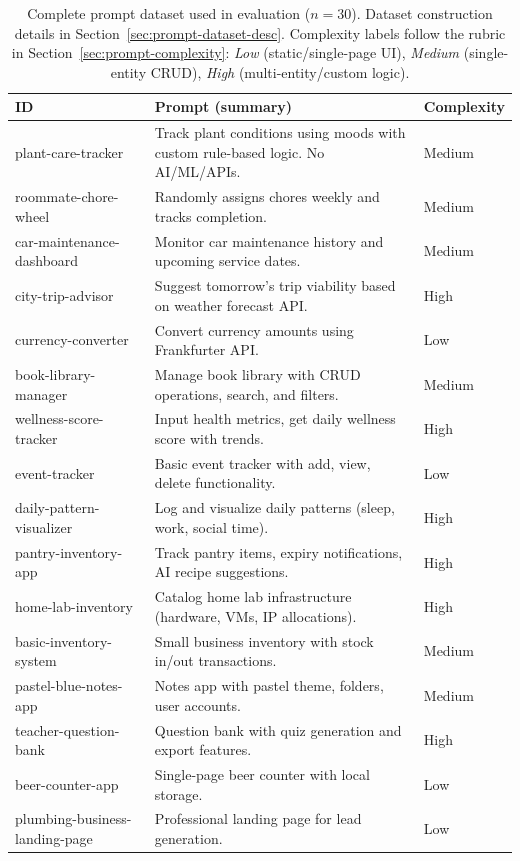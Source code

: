 \documentclass[11pt]{article}
\begin{document}
\begin{table}[h]
\caption{Complete prompt dataset used in evaluation ($n=30$). Dataset construction details in Section~\ref{sec:prompt-dataset-desc}. Complexity labels follow the rubric in Section~\ref{sec:prompt-complexity}: \emph{Low} (static/single-page UI), \emph{Medium} (single-entity CRUD), \emph{High} (multi-entity/custom logic).}
\label{tab:prompt-dataset}
\centering
\scriptsize
\begin{tabular}{p{3cm}p{8cm}p{1.5cm}}
\toprule
ID & Prompt (summary) & Complexity \\
\midrule
plant-care-tracker & Track plant conditions using moods with custom rule-based logic. No AI/ML/APIs. & Medium \\
roommate-chore-wheel & Randomly assigns chores weekly and tracks completion. & Medium \\
car-maintenance-dashboard & Monitor car maintenance history and upcoming service dates. & Medium \\
city-trip-advisor & Suggest tomorrow's trip viability based on weather forecast API. & High \\
currency-converter & Convert currency amounts using Frankfurter API. & Low \\
book-library-manager & Manage book library with CRUD operations, search, and filters. & Medium \\
wellness-score-tracker & Input health metrics, get daily wellness score with trends. & High \\
event-tracker & Basic event tracker with add, view, delete functionality. & Low \\
daily-pattern-visualizer & Log and visualize daily patterns (sleep, work, social time). & High \\
pantry-inventory-app & Track pantry items, expiry notifications, AI recipe suggestions. & High \\
home-lab-inventory & Catalog home lab infrastructure (hardware, VMs, IP allocations). & High \\
basic-inventory-system & Small business inventory with stock in/out transactions. & Medium \\
pastel-blue-notes-app & Notes app with pastel theme, folders, user accounts. & Medium \\
teacher-question-bank & Question bank with quiz generation and export features. & High \\
beer-counter-app & Single-page beer counter with local storage. & Low \\
plumbing-business-landing-page & Professional landing page for lead generation. & Low \\

\end{tabular}
\end{table}
\end{document}

